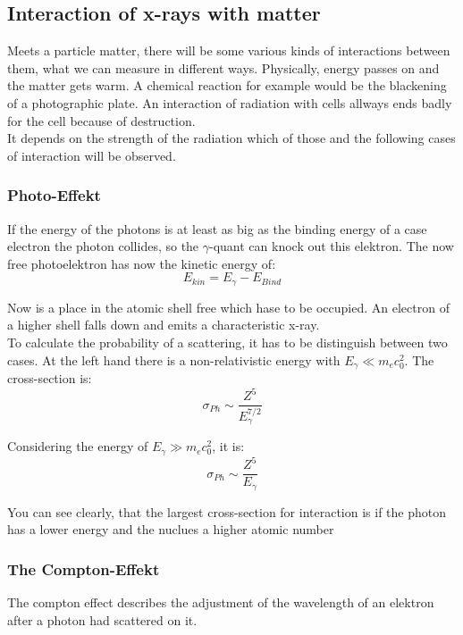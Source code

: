 \subsection{Interaction of x-rays with matter}

Meets a particle matter, there will be some various kinds of interactions between them, what we can measure in different ways. Physically, energy passes on and the matter gets warm. A chemical reaction for example would be the blackening of a photographic plate. An interaction of radiation with cells allways ends badly for the cell because of destruction.\\
It depends on the strength of the radiation which of those and the following cases of interaction will be observed.

\subsubsection*{Photo-Effekt}

If the energy of the photons is at least as big as the binding energy of a case electron the photon collides, so the $\gamma$-quant can knock out this elektron. The now free photoelektron has now the kinetic energy of:
	\begin{equation}
	E_{kin} = E_{\gamma}-E_{Bind}
	\end{equation}


Now is a place in the atomic shell free which hase to be occupied. An electron of a higher shell falls down and emits a characteristic x-ray.\\
To calculate the probability of a scattering, it has to be distinguish between two cases. At the left hand there is a non-relativistic energy with $E_{\gamma}\ll m_{e}c_{0}^{2}$. The cross-section is:
	\begin{equation}
	\sigma_{Ph} \sim \frac{Z^{5}}{E_{\gamma}^{7/2}}
	\end{equation}
	
Considering the energy of $E_{\gamma} \gg m_{e}c_{0}^{2}$, it is:
	\begin{equation}
	\sigma_{Ph} \sim \frac{Z^{5}}{E_{\gamma}}
	\end{equation}
	
You can see clearly, that the largest cross-section for interaction is if the photon has a lower energy and the nuclues a higher atomic number

\subsubsection*{The Compton-Effekt}
The compton effect describes the adjustment of the wavelength of an elektron after a photon had scattered on it.


